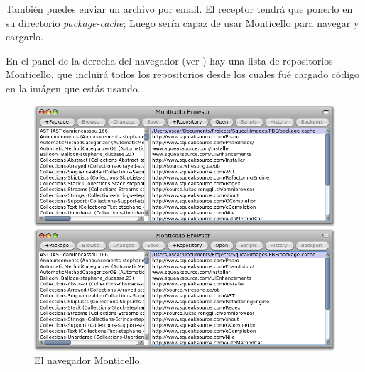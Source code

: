 \documentclass[a4paper,10pt,twoside]{book}
\begin{document}
{{%
Tambi\'en puedes enviar un archivo  por email.
El receptor tendr\'a que ponerlo en su directorio \emph{package-cache}; Luego ser\'ra capaz de usar Monticello para navegar y cargarlo.


En el panel de la derecha del navegador (ver ) hay una lista de repositorios Monticello, que incluir\'a todos los repositorios desde los cuales fu\'e cargado c\'odigo en la im\'agen que est\'as usando.


\begin{figure}[hbt]
\ifluluelse
	{\centerline {\includegraphics[width=\textwidth]{MonticelloBrowser}}}
	{\centerline {\includegraphics[scale=0.7]{MonticelloBrowser}}}
\caption{El navegador Monticello.
}
\end{figure}

}}
\end{document}

